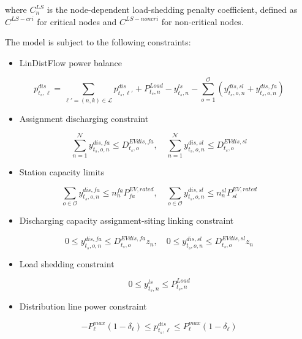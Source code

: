 \documentclass[journal]{IEEEtran}
\providecommand{\1}{\mathbf{1}}
\begin{document}
where \(C^{LS}_n\) is the node-dependent load-shedding penalty coefficient, defined as $C^{{LS-cri}}$ for critical nodes and $C^{LS-noncri}$ for non-critical nodes.

The model is subject to the following constraints:
\begin{itemize}
    \item LinDistFlow power balance
\end{itemize}
\begin{equation}
p_{t_s,\ell}^{dis} =\sum_{\ell'=(n,k)\in \mathcal{L}} p_{t_s,\ell'}^{dis} + P^{Load}_{t_s,n}-y^{ls}_{t_s,n}-\sum_{o=1}^{\mathcal{O}}\left(y_{t_s,o,n}^{{dis,sl}}
+y_{t_s,o,n}^{{dis,fa}}
\right)
\end{equation}

\begin{itemize}
    \item Assignment discharging constraint
\end{itemize}
\begin{equation}
\sum_{n=1}^{\mathcal{N}} y_{t_s,o,n}^{dis,fa}
\le
D_{t_s,o}^{EVdis,fa},\quad
\sum_{n=1}^{\mathcal{N}} y_{t_s,o,n}^{dis,sl}
\le
D_{t_s,o}^{EVdis,sl}
\end{equation}
\begin{itemize}
    \item Station capacity limits
\end{itemize}
\begin{equation}
\sum_{o \in \mathcal O}
y_{t_s,o,n}^{dis,fa}\le n_n^{fa}P^{EV,rated}_{fa},
\quad
\sum_{o \in \mathcal O}
y_{t_s,o,n}^{dis,sl}\le n_n^{sl}P^{EV,rated}_{sl}
\end{equation}


\begin{itemize}
    \item Discharging capacity assignment-siting linking constraint
\end{itemize}
\begin{equation}
0\le y_{t_s,o,n}^{dis,fa}
\le
D_{t_s,o}^{EVdis,fa}z_n, \quad
0\le y_{t_s,o,n}^{dis,sl}
\le
D_{t_s,o}^{EVdis,sl}z_n
\label{eq:47}
\end{equation}
\begin{itemize}
    \item Load shedding constraint
\end{itemize}
\begin{equation}
0\le
y^{ls}_{t_s,n}\le P^{Load}_{t_s,n}
\end{equation}
\begin{itemize}
    \item Distribution line power constraint
\end{itemize}
\begin{equation}
-P^{max}_{{\ell}}(1-\delta_{\ell})\le
p_{t_s,{\ell}}^{dis}\le P^{max}_{{\ell}}(1-\delta_{\ell})
\end{equation}
\end{document}
